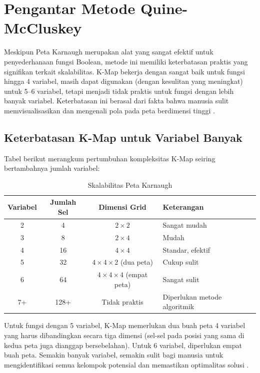\section{Pengantar Metode Quine-McCluskey}

Meskipun Peta Karnaugh merupakan alat yang sangat efektif untuk penyederhanaan fungsi Boolean, metode ini memiliki keterbatasan praktis yang signifikan terkait skalabilitas. K-Map bekerja dengan sangat baik untuk fungsi hingga 4 variabel, masih dapat digunakan (dengan kesulitan yang meningkat) untuk 5--6 variabel, tetapi menjadi tidak praktis untuk fungsi dengan lebih banyak variabel. Keterbatasan ini berasal dari fakta bahwa manusia sulit memvisualisasikan dan mengenali pola pada peta berdimensi tinggi \cite{rosen2019,saylor_cs202}.

\subsection{Keterbatasan K-Map untuk Variabel Banyak}

Tabel berikut merangkum pertumbuhan kompleksitas K-Map seiring bertambahnya jumlah variabel:

\begin{table}[htbp]
\centering
\renewcommand{\arraystretch}{1.3}
\begin{tabular}{|c|c|c|l|}
\hline
\textbf{Variabel} & \textbf{Jumlah Sel} & \textbf{Dimensi Grid} & \textbf{Keterangan} \\ \hline
2 & 4 & $2 \times 2$ & Sangat mudah \\ \hline
3 & 8 & $2 \times 4$ & Mudah \\ \hline
4 & 16 & $4 \times 4$ & Standar, efektif \\ \hline
5 & 32 & $4 \times 4 \times 2$ (dua peta) & Cukup sulit \\ \hline
6 & 64 & $4 \times 4 \times 4$ (empat peta) & Sangat sulit \\ \hline
7+ & 128+ & Tidak praktis & Diperlukan metode algoritmik \\ \hline
\end{tabular}
\caption{Skalabilitas Peta Karnaugh}
\label{tab:skalabilitas-kmap}
\end{table}

Untuk fungsi dengan 5 variabel, K-Map memerlukan dua buah peta 4 variabel yang harus dibandingkan secara tiga dimensi (sel-sel pada posisi yang sama di kedua peta juga dianggap bersebelahan). Untuk 6 variabel, diperlukan empat buah peta. Semakin banyak variabel, semakin sulit bagi manusia untuk mengidentifikasi semua kelompok potensial dan memastikan optimalitas solusi \cite{wiki_karnaugh}.

